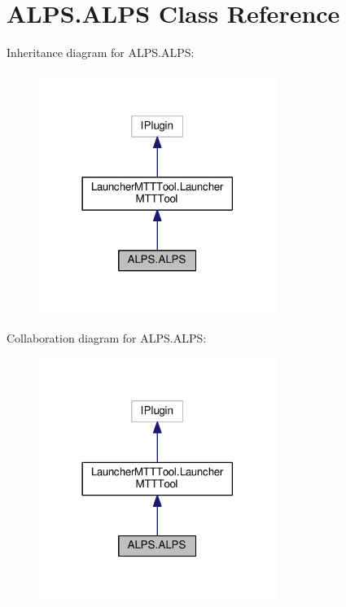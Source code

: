 \hypertarget{classALPS_1_1ALPS}{\section{A\-L\-P\-S.\-A\-L\-P\-S Class Reference}
\label{classALPS_1_1ALPS}
}


Inheritance diagram for A\-L\-P\-S.\-A\-L\-P\-S\-:
\nopagebreak
\begin{figure}[H]
\begin{center}
\leavevmode
\includegraphics[width=218pt]{classALPS_1_1ALPS__inherit__graph}
\end{center}
\end{figure}


Collaboration diagram for A\-L\-P\-S.\-A\-L\-P\-S\-:
\nopagebreak
\begin{figure}[H]
\begin{center}
\leavevmode
\includegraphics[width=218pt]{classALPS_1_1ALPS__coll__graph}
\end{center}
\end{figure}
